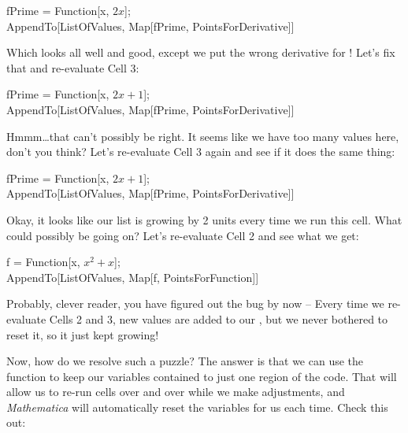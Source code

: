\begin{code}
	   fPrime = Function[x, $2x$];\\
	   AppendTo[ListOfValues, Map[fPrime, PointsForDerivative]]\\
\end{code}

Which looks all well and good, except we put the wrong derivative for ! Let's fix that and re-evaluate Cell 3:

\begin{code}
	   fPrime = Function[x, $2x + 1$];\\
	   AppendTo[ListOfValues, Map[fPrime, PointsForDerivative]]\\
\end{code}

Hmmm\ldots that can't possibly be right. It seems like we have too many values here, don't you think? Let's re-evaluate Cell 3 again and see if it does the same thing:

\begin{code}
	   fPrime = Function[x, $2x + 1$];\\
	   AppendTo[ListOfValues, Map[fPrime, PointsForDerivative]]\\
\end{code}

Okay, it looks like our list is growing by 2 units every time we run this cell. What could possibly be going on? Let's re-evaluate Cell 2 and see what we get:

\begin{code}
	   f = Function[x, $x^2 + x$];\\
	   AppendTo[ListOfValues, Map[f, PointsForFunction]]\\
\end{code}

Probably, clever reader, you have figured out the bug by now -- Every time we re-evaluate Cells 2 and 3, new values are added to our , but we never bothered to reset it, so it just kept growing! 

Now, how do we resolve such a puzzle? The answer is that we can use the  function to keep our variables contained to just one region of the code. That will allow us to re-run cells over and over while we make adjustments, and \emph{Mathematica} will automatically reset the variables for us each time. Check this out:

